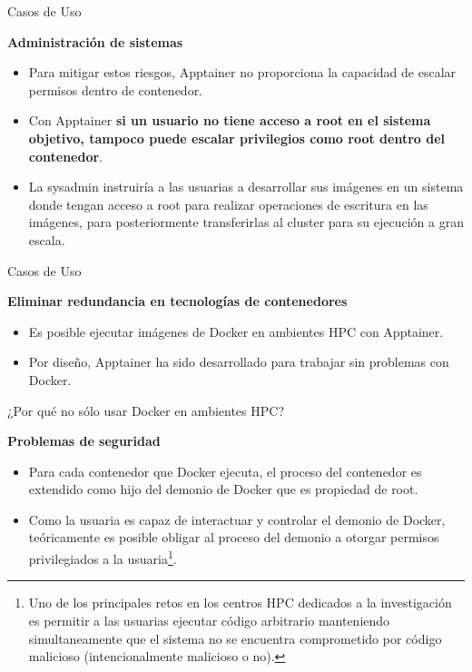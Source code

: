 \documentclass[11pt]{beamer}
\begin{document}
\begin{frame}{Casos de Uso}

\textbf{Administración de sistemas}

\begin{itemize}
	\item Para mitigar estos riesgos, Apptainer no proporciona la capacidad de escalar permisos dentro de contenedor.
	\item Con Apptainer \textbf{si un usuario no tiene acceso a root en el sistema objetivo, tampoco puede escalar privilegios como root dentro del contenedor}. 
	\item La sysadmin instruiría  a las usuarias a desarrollar sus imágenes en un sistema donde tengan acceso a root para realizar operaciones de escritura en las imágenes, para posteriormente transferirlas al cluster para su ejecución a gran escala.
\end{itemize}
\end{frame}

\begin{frame}{Casos de Uso}

\textbf{Eliminar redundancia en tecnologías de contenedores}

\begin{itemize}
	\item Es posible ejecutar imágenes de Docker en ambientes HPC con Apptainer.
	\item Por diseño, Apptainer ha sido desarrollado para trabajar sin problemas con Docker. 
\end{itemize}
\end{frame}

\begin{frame}{¿Por qué no sólo usar Docker en ambientes HPC?}

\begin{center}
	\textbf{Problemas de seguridad}
\end{center}

\begin{itemize}
	\item Para cada contenedor que Docker ejecuta, el proceso del contenedor es extendido como hijo del demonio de Docker que es propiedad de root. 
	\item Como la usuaria es capaz de interactuar y controlar el demonio de Docker, teóricamente es posible obligar al proceso del demonio a otorgar permisos privilegiados a la usuaria\footnote{ Uno de los principales retos en los centros HPC dedicados a la investigación es permitir a las usuarias ejecutar código arbitrario manteniendo simultaneamente que el sistema no se encuentra comprometido por código malicioso (intencionalmente malicioso o no).}.
\end{itemize}

\end{frame}
\end{document}
